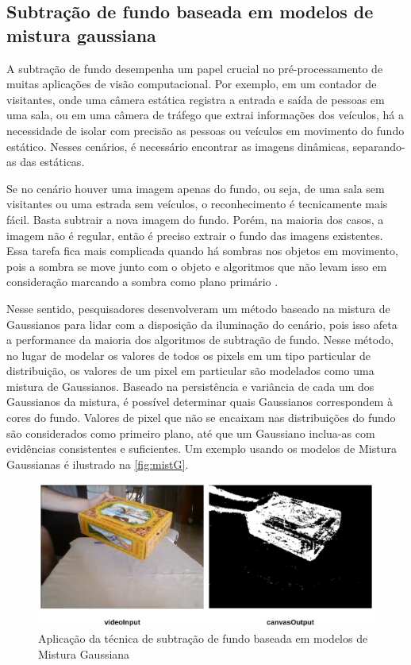 \documentclass[12pt, %
openright, 
oneside, %
a4paper,    %
brazil]{facom-ufu-abntex2}
\begin{document}
\subsection{Subtração de fundo baseada em modelos de mistura gaussiana}

A subtração de fundo desempenha um papel crucial no pré-processamento de muitas
aplicações de visão computacional. Por exemplo, em um contador de visitantes,
onde uma câmera estática registra a entrada e saída de pessoas em uma sala, ou
em uma câmera de tráfego que extrai informações dos veículos, há a necessidade
de isolar com precisão as pessoas ou veículos em movimento do fundo estático.
Nesses cenários, é necessário encontrar as imagens dinâmicas, separando-as das
estáticas.

Se no cenário houver uma imagem apenas do fundo, ou seja, de uma sala sem
visitantes ou uma estrada sem veículos, o reconhecimento é tecnicamente mais
fácil. Basta subtrair a nova imagem do fundo. Porém, na maioria dos casos, a
imagem não é regular, então é preciso extrair o fundo das imagens existentes.
Essa tarefa fica mais complicada quando há sombras nos objetos em movimento,
pois a sombra se move junto com o objeto e algoritmos que não levam isso em
consideração marcando a sombra como plano primário \cite{opencv_bgsubtraction}.

Nesse sentido, pesquisadores desenvolveram um método baseado na mistura de
Gaussianos para lidar com a disposição da iluminação do cenário, pois isso
afeta a performance da maioria dos algoritmos de subtração de fundo. Nesse
método, no lugar de modelar os valores de todos os pixels em um tipo particular
de distribuição, os valores de um pixel em particular são modelados como uma
mistura de Gaussianos. Baseado na persistência e variância de cada um dos
Gaussianos da mistura, é possível determinar quais Gaussianos correspondem à
cores do fundo. Valores de pixel que não se encaixam nas distribuições do fundo
são considerados como primeiro plano, até que um Gaussiano inclua-as com
evidências consistentes e suficientes. Um exemplo usando os modelos de Mistura
Gaussianas é ilustrado na \autoref{fig:mistG}.

\begin{figure}[ht]
	\centering
	\includegraphics[width=0.7\linewidth]{background_subtraction.jpeg}
	\caption{Aplicação da técnica de subtração de fundo baseada em modelos
		de Mistura Gaussiana}

	\label{fig:mistG}
\end{figure}
\end{document}
